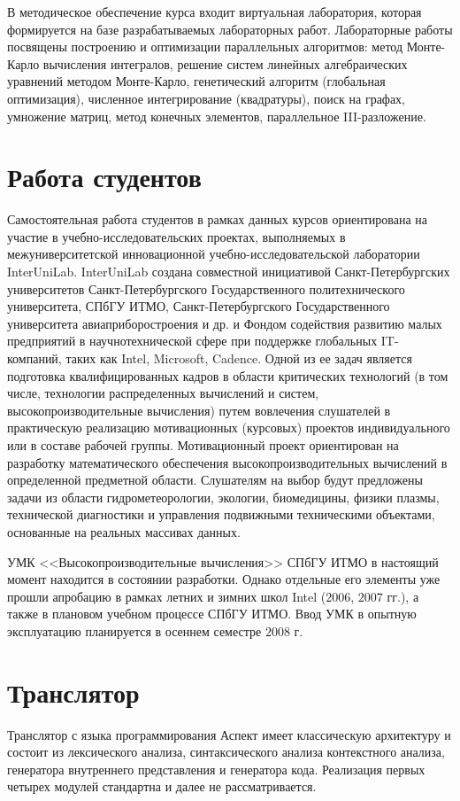 \documentclass[a4paper,11pt]{article} %
\begin{document}
	В методическое обеспечение курса входит виртуальная лаборатория, которая формируется
	на базе разрабатываемых лабораторных работ. Лабораторные работы посвящены построению и
	оптимизации параллельных алгоритмов: метод Монте-Карло вычисления интегралов, решение
	систем линейных алгебраических уравнений методом Монте-Карло, генетический алгоритм (глобальная оптимизация), численное интегрирование (квадратуры), поиск на графах, умножение
	матриц, метод конечных элементов, параллельное III-разложение.
	
	\section{Работа студентов}
	Самостоятельная работа студентов в рамках данных курсов ориентирована на участие
	в учебно-исследовательских проектах, выполняемых в межуниверситетской инновационной
	учебно-исследовательской лаборатории InterUniLab. InterUniLab создана совместной инициативой Санкт-Петербургских университетов Санкт-Петербургского Государственного политехнического университета, СПбГУ ИТМО, Санкт-Петербургского Государственного университета
	авиаприборостроения и др. и Фондом содействия развитию малых предприятий в научнотехнической сфере при поддержке глобальных IT-компаний, таких как Intel, Microsoft, Cadence.
	Одной из ее задач является подготовка квалифицированных кадров в области критических технологий (в том числе, технологии распределенных вычислений и систем, высокопроизводительные
	вычисления) путем вовлечения слушателей в практическую реализацию мотивационных (курсовых) проектов индивидуального или в составе рабочей группы. Мотивационный проект ориентирован на разработку математического обеспечения высокопроизводительных вычислений в
	определенной предметной области. Слушателям на выбор будут предложены задачи из области
	гидрометеорологии, экологии, биомедицины, физики плазмы, технической диагностики и управления подвижными техническими объектами, основанные на реальных массивах данных.
	{\sloppy
		
	}
	УМК <<Высокопроизводительные вычисления>> СПбГУ ИТМО в настоящий момент находится в состоянии разработки. Однако отдельные его элементы уже прошли апробацию в рамках летних и зимних школ Intel ($2006$, $2007$ гг.), а также в плановом учебном процессе СПбГУ ИТМО. Ввод УМК в опытную эксплуатацию планируется в осеннем семестре $2008$ г.
	
	\section{Транслятор}
	Транслятор с языка программирования Аспект имеет классическую архитектуру и состоит из
	лексического анализа, синтаксического анализа контекстного анализа, генератора внутреннего
	представления и генератора кода. Реализация первых четырех модулей стандартна и далее не
	рассматривается.
	
\end{document}
